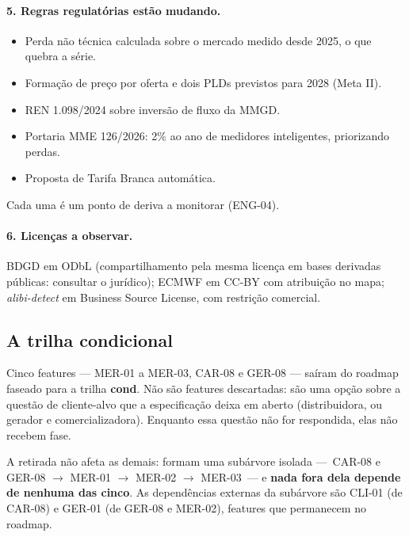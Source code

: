 \paragraph{5. Regras regulatórias estão mudando.}
\begin{itemize}
  \item Perda não técnica calculada sobre o mercado medido desde 2025, o que
    quebra a série.
  \item Formação de preço por oferta e dois PLDs previstos para 2028 (Meta II).
  \item REN 1.098/2024 sobre inversão de fluxo da MMGD.
  \item Portaria MME 126/2026: 2\% ao ano de medidores inteligentes,
    priorizando perdas.
  \item Proposta de Tarifa Branca automática.
\end{itemize}
Cada uma é um ponto de deriva a monitorar (ENG-04).

\paragraph{6. Licenças a observar.} BDGD em ODbL (compartilhamento pela mesma
licença em bases derivadas públicas: consultar o jurídico); ECMWF em CC-BY com
atribuição no mapa; \emph{alibi-detect} em Business Source License, com
restrição comercial.

\subsection*{A trilha condicional}

Cinco features --- MER-01 a MER-03, CAR-08 e GER-08 --- saíram do roadmap
faseado para a trilha \textbf{cond}. Não são features descartadas: são uma
opção sobre a questão de cliente-alvo que a especificação deixa em aberto
(distribuidora, ou gerador e comercializadora). Enquanto essa questão não for
respondida, elas não recebem fase.

A retirada não afeta as demais: formam uma subárvore isolada
---~CAR-08 e GER-08 $\rightarrow$ MER-01 $\rightarrow$ MER-02 $\rightarrow$
MER-03~--- e \textbf{nada fora dela depende de nenhuma das cinco}. As
dependências externas da subárvore são CLI-01 (de CAR-08) e GER-01 (de GER-08
e MER-02), features que permanecem no roadmap.

